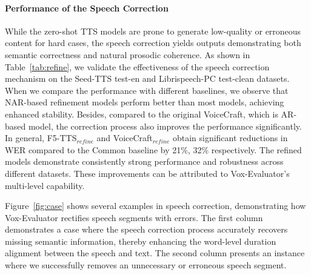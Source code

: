 \documentclass[letterpaper]{article} %
\begin{document}
\paragraph{Performance of the Speech Correction}
While the zero-shot TTS models are prone to generate low-quality or erroneous content for hard cases, the speech correction yields outputs demonstrating both semantic correctness and natural prosodic coherence.
As shown in Table~\ref{tab:refine}, we validate the effectiveness of the speech correction mechanism on the Seed-TTS test-en and Librispeech-PC test-clean datasets. When we compare the performance with different baselines, we observe that NAR-based refinement models perform better than most models, achieving enhanced stability. 
Besides, compared to the original VoiceCraft, which is AR-based model, the correction process also improves the performance significantly. 
In general, F5-TTS$_{refine}$ and VoiceCraft$_{refine}$ obtain significant reductions in WER compared to the Common baseline by 21\%, 32\% respectively. The refined models demonstrate consistently strong performance and robustness across different datasets. These improvements can be attributed to Vox-Evaluator's multi-level capability.

Figure~\ref{fig:case} shows several examples in speech correction, demonstrating how Vox-Evaluator rectifies speech segments with errors. The first column demonstrates a case where the speech correction process accurately recovers missing semantic information, thereby enhancing the word-level duration alignment between the speech and text. The second column presents an instance where we successfully removes an unnecessary or erroneous speech segment. 
\end{document}
